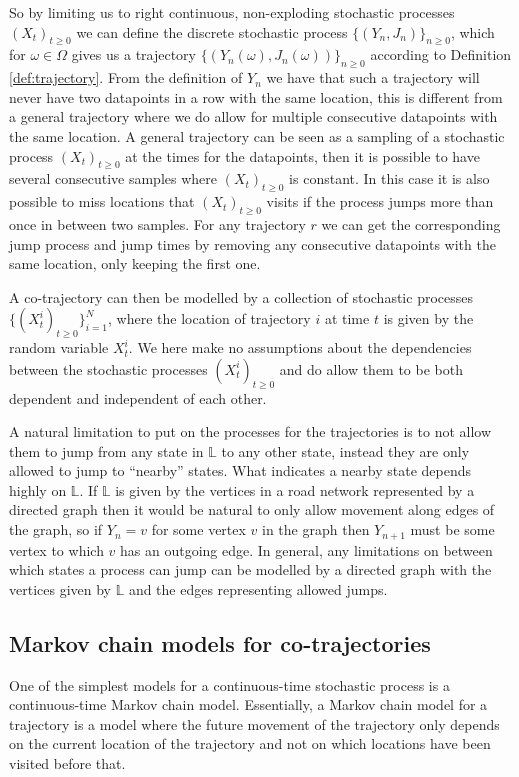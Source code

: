 \documentclass[12pt]{article}
\newcommand{\traj}{r}
\newcommand{\locset}{\mathbb{L}}
\theoremstyle{definition}
\begin{document}
So by limiting us to right continuous, non-exploding stochastic
processes \((X_{t})_{t \geq 0}\) we can define the discrete stochastic
process \(\{(Y_{n}, J_{n})\}_{n \geq 0}\), which for
\(\omega \in \Omega\) gives us a trajectory
\(\{(Y_{n}(\omega), J_{n}(\omega))\}_{n \geq 0}\) according to
Definition \ref{def:trajectory}. From the definition of \(Y_{n}\) we
have that such a trajectory will never have two datapoints in a row
with the same location, this is different from a general trajectory
where we do allow for multiple consecutive datapoints with the same
location. A general trajectory can be seen as a sampling of a
stochastic process \((X_{t})_{t \geq 0}\) at the times for the
datapoints, then it is possible to have several consecutive samples
where \((X_{t})_{t \geq 0}\) is constant. In this case it is also
possible to miss locations that \((X_{t})_{t \geq 0}\) visits if the
process jumps more than once in between two samples. For any
trajectory \(\traj\) we can get the corresponding jump process and
jump times by removing any consecutive datapoints with the same
location, only keeping the first one.

A co-trajectory can then be modelled by a collection of stochastic
processes \(\{(X_{t}^{i})_{t \geq 0}\}_{i = 1}^{N}\), where the
location of trajectory \(i\) at time \(t\) is given by the random
variable \(X_{t}^{i}\). We here make no assumptions about the
dependencies between the stochastic processes
\((X_{t}^{i})_{t \geq 0}\) and do allow them to be both dependent and
independent of each other.

A natural limitation to put on the processes for the trajectories is
to not allow them to jump from any state in \(\locset\) to any other
state, instead they are only allowed to jump to ``nearby'' states.
What indicates a nearby state depends highly on \(\locset\). If
\(\locset\) is given by the vertices in a road network represented by
a directed graph then it would be natural to only allow movement along
edges of the graph, so if \(Y_{n} = v\) for some vertex \(v\) in the
graph then \(Y_{n + 1}\) must be some vertex to which \(v\) has an
outgoing edge. In general, any limitations on between which states a
process can jump can be modelled by a directed graph with the vertices
given by \(\locset\) and the edges representing allowed jumps.

\subsection{Markov chain models for co-trajectories}
\label{sec:markov-chain-models}
One of the simplest models for a continuous-time stochastic process is
a continuous-time Markov chain model. Essentially, a Markov chain
model for a trajectory is a model where the future movement of the
trajectory only depends on the current location of the trajectory and
not on which locations have been visited before that.
\end{document}
